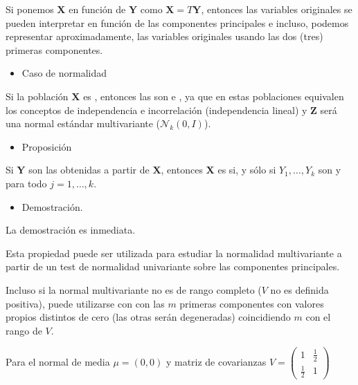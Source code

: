 Si ponemos $\mathbf{X}$ en función de $\mathbf{Y}$ como $\mathbf{X}=T\mathbf{Y}$, entonces las variables originales se pueden interpretar en función de las componentes principales e incluso, podemos representar aproximadamente, las variables originales usando las dos (tres) primeras componentes.
\begin{itemize}[label=\color{red}\textbullet, leftmargin=*]
	\item \color{lightblue}Caso de normalidad
\end{itemize}
Si la población $\mathbf{X}$ es , entonces las  son  e , ya que en estas poblaciones equivalen los conceptos de independencia e incorrelación (independencia lineal) y $\mathbf{Z}$ será una normal estándar multivariante ($\mathcal{N}_k(0,I)$).
\begin{itemize}[label=\color{red}\textbullet, leftmargin=*]
	\item \color{lightblue}Proposición
\end{itemize}
Si $\mathbf{Y}$ son las  obtenidas a partir de $\mathbf{X}$, entonces $\mathbf{X}$ es  si, y sólo si $Y_1,\dots,Y_k$ son  y  para todo $j=1,\dots,k$.
\begin{itemize}[label=\color{red}\textbullet, leftmargin=*]
	\item \color{lightblue}Demostración.
\end{itemize}
La demostración es inmediata.

Esta propiedad puede ser utilizada para estudiar la normalidad multivariante a partir de un test de normalidad univariante sobre las componentes principales.

Incluso si la normal multivariante no es de rango completo ($V$ no es definida positiva), puede utilizarse con con las $m$ primeras componentes con valores propios distintos de cero (las otras serán degeneradas) coincidiendo $m$ con el rango de $V$.

\Ej

Para el \vea normal de media $\mu=(0,0)$ y matriz de covarianzas $V=\begin{pmatrix}
	1 & \tfrac{1}{2}\\
	\tfrac{1}{2} & 1
\end{pmatrix}$

\hspace{1cm}


